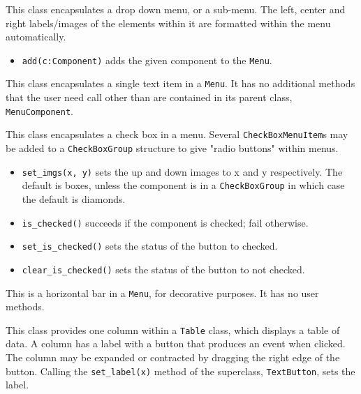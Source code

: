 \medskip{}

This class encapsulates a drop down menu, or a sub-menu. The left,
center and right labels/images of the elements within it are formatted
within the menu automatically.

\begin{itemize}
\item\noindent\texttt{add(c:Component)} adds the given component to the  \texttt{Menu}.
\end{itemize}

\medskip{}

This class encapsulates a single text item in a  \texttt{Menu}. It has no
additional methods that the user need call other than are contained in
its parent class,  \texttt{MenuComponent}.

\medskip{}

This class encapsulates a check box in a menu. Several  \texttt{CheckBoxMenuItem}s
may be added to a  \texttt{CheckBoxGroup} structure to give "radio
buttons" within menus.

\begin{itemize}
\item\noindent\texttt{set\_imgs(x, y)} sets the up and down images to x and y respectively.
The default is boxes, unless
the component is in a  \texttt{CheckBoxGroup} in which case the
default is diamonds.

\item\noindent\texttt{is\_checked()} succeeds if the component is checked; fail
otherwise.

\item\noindent\texttt{set\_is\_checked()} sets the status of the button to checked.

\item\noindent\texttt{clear\_is\_checked()} sets the status of the button to not checked.
\end{itemize}

\medskip{}

This is a horizontal bar in a  \texttt{Menu}, for decorative purposes. It
has no user methods.

\medskip{}

This class provides one column within a  \texttt{Table} class, which displays a
table of data. A column has a label with a button that produces an
event when clicked. The column may be expanded or contracted by
dragging the right edge of the button. Calling the \texttt{set\_label(x)} method
of the superclass,  \texttt{TextButton}, sets the label.

